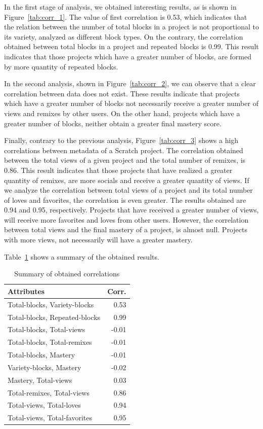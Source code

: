 \documentclass[a4paper,twocolumn,10pt]{article}
\begin{document}
In the first stage of analysis, we obtained interesting results, as is shown in
Figure~\ref{tab:corr_1}. The value of first correlation is 0.53, which indicates that the 
relation between the number of total blocks in a project is not proportional
to its variety, analyzed as different block types. On the contrary, the
correlation obtained between total blocks in a project and repeated blocks is
0.99. This result indicates that those projects which have a greater number of 
blocks, are formed by more quantity of repeated blocks.

In the second analysis, shown in Figure~\ref{tab:corr_2}, we can observe that 
a clear correlation between data does not exist. These results indicate that projects which have
a greater number of blocks not necessarily receive a greater number of views and
remixes by other users. On the other hand, projects which have a greater number of
blocks, neither obtain a greater final mastery score.

Finally, contrary to the previous analysis, Figure~\ref{tab:corr_3} shows a high correlations 
between metadata of a Scratch project. The correlation obtained between the total
views of a given project and the total number of remixes, is 0.86. This result 
indicates that those projects that have realized a greater quantity of remixes,
are more socials and receive a greater quantity of views. If we analyze the 
correlation between total views of a project and its total number of loves and
favorites, the correlation is even greater. The results obtained are 0.94 and 0.95,
respectively. Projects that have received a greater number of views, will receive more
favorites and loves from other users. However, the correlation between total views and the
final mastery of a project, is almost null. Projects with more views, not necessarily
will have a greater mastery.

Table~\ref{tab:values} shows a summary of the obtained results.

\begin{table}
   \begin{tabular}{lr}
    \toprule
    \textbf{Attributes} &\textbf{Corr.} \\
    \midrule
	Total-blocks, Variety-blocks & 0.53\\
        Total-blocks, Repeated-blocks & 0.99\\
        Total-blocks, Total-views & -0.01\\
        Total-blocks, Total-remixes & -0.01\\
        Total-blocks, Mastery & -0.01\\
        Variety-blocks, Mastery & -0.02 \\
        Mastery, Total-views & 0.03\\
        Total-remixes, Total-views & 0.86\\
        Total-views, Total-loves & 0.94\\
        Total-views, Total-favorites & 0.95\\
    \bottomrule
    \end{tabular}
    \caption{Summary of obtained correlations}
    \label{tab:values}
\end{table}
\end{document}
